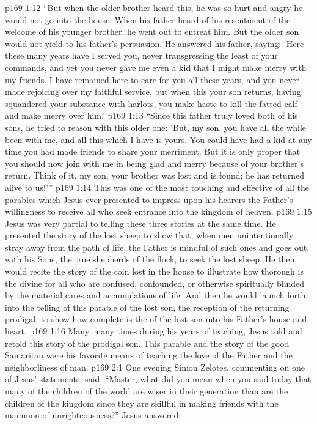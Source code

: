 \vs p169 1:12 \textcolor{ubdarkred}{“But when the older brother heard this, he was so hurt and angry he would not go into the house. When his father heard of his resentment of the welcome of his younger brother, he went out to entreat him. But the older son would not yield to his father’s persuasion. He answered his father, saying: ‘Here these many years have I served you, never transgressing the least of your commands, and yet you never gave me even a kid that I might make merry with my friends. I have remained here to care for you all these years, and you never made rejoicing over my faithful service, but when this your son returns, having squandered your substance with harlots, you make haste to kill the fatted calf and make merry over him.’}
\vs p169 1:13 \textcolor{ubdarkred}{“Since this father truly loved both of his sons, he tried to reason with this older one: ‘But, my son, you have all the while been with me, and all this which I have is yours. You could have had a kid at any time you had made friends to share your merriment. But it is only proper that you should now join with me in being glad and merry because of your brother’s return. Think of it, my son, your brother was lost and is found; he has returned alive to us!’”}
\vs p169 1:14 \pc This was one of the most touching and effective of all the parables which Jesus ever presented to impress upon his hearers the Father’s willingness to receive all who seek entrance into the kingdom of heaven.
\vs p169 1:15 Jesus was very partial to telling these three stories at the same time. He presented the story of the lost sheep to show that, when men unintentionally stray away from the path of life, the Father is mindful of such  ones and goes out, with his Sons, the true shepherds of the flock, to seek the lost sheep. He then would recite the story of the coin lost in the house to illustrate how thorough is the divine  for all who are confused, confounded, or otherwise spiritually blinded by the material cares and accumulations of life. And then he would launch forth into the telling of this parable of the lost son, the reception of the returning prodigal, to show how complete is the  of the lost son into his Father’s house and heart.
\vs p169 1:16 Many, many times during his years of teaching, Jesus told and retold this story of the prodigal son. This parable and the story of the good Samaritan were his favorite means of teaching the love of the Father and the neighborliness of man.
\vs p169 2:1 One evening Simon Zelotes, commenting on one of Jesus’ statements, said: “Master, what did you mean when you said today that many of the children of the world are wiser in their generation than are the children of the kingdom since they are skillful in making friends with the mammon of unrighteousness?” Jesus answered:
